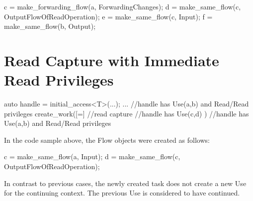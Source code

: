 \begin{CppCode}
c = make_forwarding_flow(a, ForwardingChanges);
d = make_same_flow(c, OutputFlowOfReadOperation);
e = make_same_flow(c, Input);
f = make_same_flow(b, Output);
\end{CppCode}

\section{Read Capture with Immediate Read Privileges}
\begin{CppCode}
auto handle = initial_access<T>(...);
...
//handle has Use(a,b) and Read/Read privileges
create_work([=]{ //read capture
  //handle has Use(c,d)
})
//handle has Use(a,b) and Read/Read privileges
\end{CppCode}
In the code sample above, the Flow objects were created as follows:

\begin{CppCode}
c = make_same_flow(a, Input);
d = make_same_flow(c, OutputFlowOfReadOperation);
\end{CppCode}
In contrast to previous cases, the newly created task does not create a new Use for the continuing context.
The previous Use is considered to have continued.


